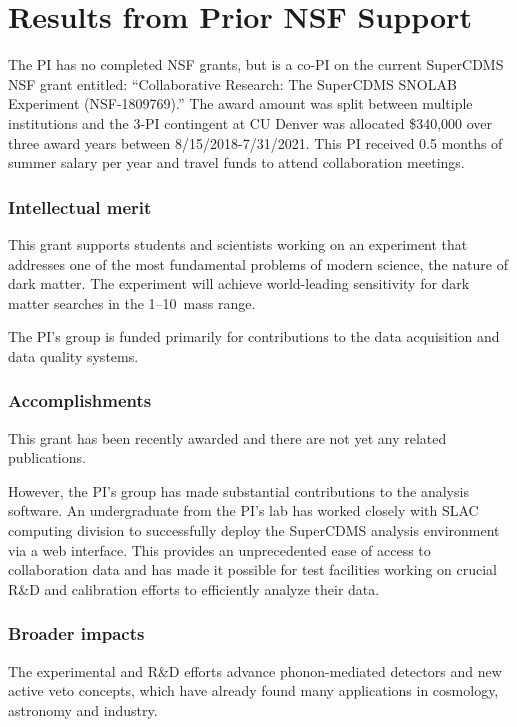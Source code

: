 
\section{Results from Prior NSF Support}
\label{sec:prev-res}

The PI has no completed NSF grants, but is a co-PI on the current SuperCDMS NSF grant entitled: ``Collaborative Research: The SuperCDMS SNOLAB Experiment (NSF-1809769).'' The award amount was split between multiple institutions and the 3-PI contingent at CU Denver was allocated \$340,000 over three award years between 8/15/2018-7/31/2021. This PI received 0.5 months of summer salary per year and travel funds to attend collaboration meetings.

\subsubsection{Intellectual merit} 
This grant supports students and scientists working on an experiment that addresses one of the most fundamental problems of modern science, the nature of dark matter. The \scs experiment will achieve world-leading sensitivity for dark matter searches in the 1--10~\gev mass range.

The PI's group is funded primarily for contributions to the data acquisition and data quality systems.


\subsubsection{Accomplishments}
This grant has been recently awarded and there are not yet any related publications.

However, the PI's group has made substantial contributions to the analysis software.  An undergraduate from the PI's lab has worked closely with SLAC computing division to successfully deploy the SuperCDMS analysis environment via a web interface.  This provides an unprecedented ease of access to collaboration data and has made it possible for test facilities working on crucial R\&D and calibration efforts to efficiently analyze their data.

\subsubsection{Broader impacts}
The \SuperCDMS experimental and R\&D efforts advance phonon-mediated detectors and new active veto concepts, which have already found many applications in cosmology, astronomy and industry. 

